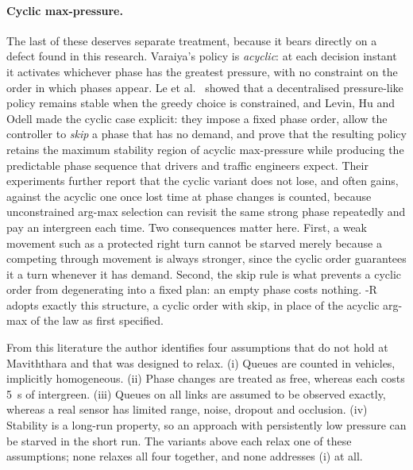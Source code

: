 \paragraph*{Cyclic max-pressure.} The last of these deserves separate treatment, because it bears directly on a
defect found in this research. Varaiya's policy is \emph{acyclic}: at each decision instant it activates
whichever phase has the greatest pressure, with no constraint on the order in which phases appear. Le et
al.\ \cite{le2015decentralized} showed that a decentralised pressure-like policy remains stable when the
greedy choice is constrained, and Levin, Hu and Odell \cite{levin2020cyclic} made the cyclic case explicit:
they impose a fixed phase order, allow the controller to \emph{skip} a phase that has no demand, and prove
that the resulting policy retains the maximum stability region of acyclic max-pressure while producing the
predictable phase sequence that drivers and traffic engineers expect. Their experiments further report that
the cyclic variant does not lose, and often gains, against the acyclic one once lost time at phase changes is
counted, because unconstrained arg-max selection can revisit the same strong phase repeatedly and pay an
intergreen each time. Two consequences matter here. First, a weak movement such as a protected right turn
cannot be starved merely because a competing through movement is always stronger, since the cyclic order
guarantees it a turn whenever it has demand. Second, the skip rule is what prevents a cyclic order from
degenerating into a fixed plan: an empty phase costs nothing. \prism{}-R adopts exactly this structure, a
cyclic order with skip, in place of the acyclic arg-max of the law as first specified.

From this literature the author identifies four assumptions that do not hold at Maviththara and that \prism{}
was designed to relax. (i) Queues are counted in vehicles, implicitly homogeneous. (ii) Phase changes are
treated as free, whereas each costs 5~s of intergreen. (iii) Queues on all links are assumed to be observed
exactly, whereas a real sensor has limited range, noise, dropout and occlusion. (iv) Stability is a long-run
property, so an approach with persistently low pressure can be starved in the short run. The variants above
each relax one of these assumptions; none relaxes all four together, and none addresses (i) at all.

